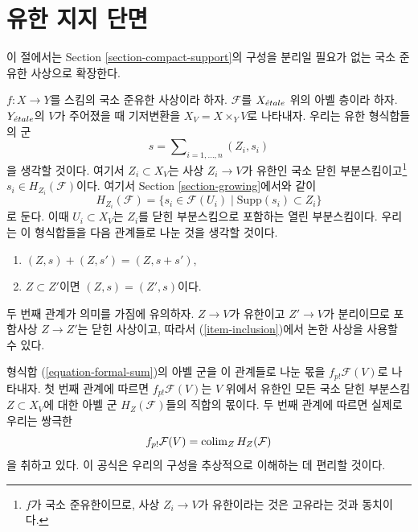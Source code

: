 \section{유한 지지 단면}
\label{section-finite-support}

\noindent
이 절에서는 Section \ref{section-compact-support}의 구성을
분리일 필요가 없는 국소 준유한 사상으로 확장한다.

\medskip\noindent
$f : X \to Y$를 스킴의 국소 준유한 사상이라 하자.
$\mathcal{F}$를 $X_{\acute{e}tale}$ 위의 아벨 층이라 하자. $Y_{\acute{e}tale}$의
$V$가 주어졌을 때 기저변환을 $X_V = X \times_Y V$로 나타내자.
우리는 유한 형식합들의 군
\begin{equation}
\label{equation-formal-sum}
s = \sum\nolimits_{i = 1, \ldots, n} (Z_i, s_i)
\end{equation}
을 생각할 것이다. 여기서 $Z_i \subset X_V$는 사상
$Z_i \to V$가 유한인 국소 닫힌 부분스킴이고\footnote{$f$가 국소
준유한이므로, 사상 $Z_i \to V$가 유한이라는 것은 고유라는 것과
동치이다.} $s_i \in H_{Z_i}(\mathcal{F})$이다. 여기서
Section \ref{section-growing}에서와 같이
$$
H_{Z_i}(\mathcal{F}) =
\{s_i \in \mathcal{F}(U_i) \mid \text{Supp}(s_i) \subset Z_i\}
$$
로 둔다. 이때 $U_i \subset X_V$는 $Z_i$를 닫힌 부분스킴으로
포함하는 열린 부분스킴이다. 우리는 이 형식합들을 다음 관계들로
나눈 것을 생각할 것이다.
\begin{enumerate}
\item
\label{item-sum}
$(Z, s) + (Z, s') = (Z, s + s')$,
\item
\label{item-sub}
$Z \subset Z'$이면 $(Z, s) = (Z', s)$이다.
\end{enumerate}
두 번째 관계가 의미를 가짐에 유의하자. $Z \to V$가 유한이고
$Z' \to V$가 분리이므로 포함사상 $Z \to Z'$는 닫힌 사상이고,
따라서 (\ref{item-inclusion})에서 논한 사상을 사용할 수 있다.

\medskip\noindent
형식합 (\ref{equation-formal-sum})의 아벨 군을 이 관계들로 나눈
몫을 $f_{p!}\mathcal{F}(V)$로 나타내자. 첫 번째 관계에 따르면
$f_{p!}\mathcal{F}(V)$는 $V$ 위에서 유한인 모든 국소 닫힌 부분스킴
$Z \subset X_V$에 대한 아벨 군 $H_Z(\mathcal{F})$들의 직합의
몫이다. 두 번째 관계에 따르면 실제로 우리는 쌍극한
\begin{equation}
\label{equation-colimit-definition}
f_{p!}\mathcal{F}(V) = \mathop{\mathrm{colim}}\nolimits_Z H_Z(\mathcal{F})
\end{equation}
을 취하고 있다. 이 공식은 우리의 구성을 추상적으로 이해하는 데
편리할 것이다.

